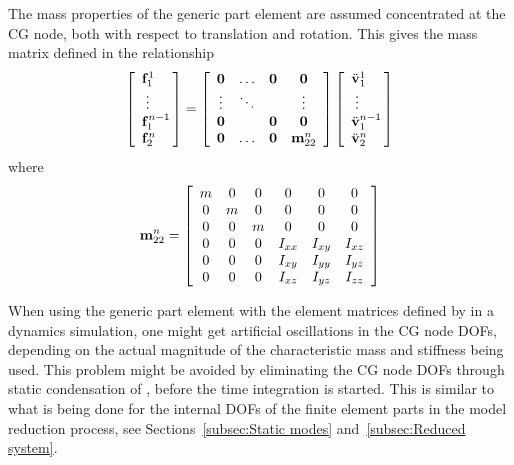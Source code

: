 The mass properties of the generic part element are assumed concentrated at the
CG node, both with respect to translation and rotation.
This gives the mass matrix defined in the relationship
%
\begin{equation}
\label{eq:generic part mass matrix}
\left[\begin{array}{l}
{\bf f}^1_1 \\ \;\vdots \\ {\bf f}^{n-1}_1 \!\!\\ {\bf f}^n_2
\end{array}\right] =
\left[\begin{array}{cccc}
{\bf 0} & \hdots & {\bf 0} & {\bf 0} \\
\vdots  & \ddots &         & \vdots  \\
{\bf 0} &        & {\bf 0} & {\bf 0} \\
{\bf 0} & \hdots & {\bf 0} & {\bf m}^n_{22}
\end{array}\right]
\left[\begin{array}{l}
\ddot{\bf v}^1_1 \\ \;\vdots \\ \ddot{\bf v}^{n-1}_1 \!\!\\ \ddot{\bf v}^n_2
\end{array}\right]
\end{equation}
%
where
%
\begin{equation}
\label{eq:m22}
{\bf m}^n_{22} =
\left[\begin{array}{cccccc}
m & 0 & 0 & 0 & 0 & 0 \\
0 & m & 0 & 0 & 0 & 0 \\
0 & 0 & m & 0 & 0 & 0 \\
0 & 0 & 0 & I_{xx} & I_{xy} & I_{xz} \\
0 & 0 & 0 & I_{xy} & I_{yy} & I_{yz} \\
0 & 0 & 0 & I_{xz} & I_{yz} & I_{zz}
\end{array}\right]
\end{equation}

When using the generic part element with the element matrices defined by
in a dynamics simulation, one might get artificial oscillations in the CG node
DOFs, depending on the actual magnitude of the characteristic mass and
stiffness being used.
This problem might be avoided by eliminating the CG node DOFs through static
condensation of
,
before the time integration is started.
This is similar to what is being done for the internal DOFs of the finite
element parts in the model reduction process,
see Sections~\ref{subsec:Static modes} and~\ref{subsec:Reduced system}.


